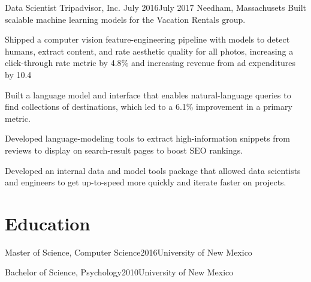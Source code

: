 \documentclass[print]{ag-cv} %
\begin{document}
\begin{job}
  {Data Scientist}
  {Tripadvisor, Inc.}
  {July 2016}{July 2017}
  {Needham, Massachusets}
  {
  Built scalable machine learning models for the Vacation Rentals group.
  }
  {
  \begin{myitemize}
    \item Shipped a computer vision feature-engineering pipeline with models to
    detect humans, extract content, and rate aesthetic quality for all photos,
    increasing a click-through rate metric by 4.8\% and increasing revenue from
    ad expenditures by 10.4%
    
    \item Built a language model and interface that enables natural-language
    queries to find collections of destinations, which led to a 6.1\%
    improvement in a primary metric.
    
    \item Developed language-modeling tools to extract high-information snippets
    from reviews to display on search-result pages to boost SEO rankings.
    
    \item Developed an internal data and model tools package that allowed data
    scientists and engineers to get up-to-speed more quickly and iterate faster
    on projects.
\end{myitemize}
}
\end{job}


\section*{Education}
  \begin{edu}{Master of Science, Computer Science}{2016}{University of New Mexico}
  \end{edu}
  \begin{edu}{Bachelor of Science, Psychology}{2010}{University of New Mexico}
  \end{edu}


\end{document}
